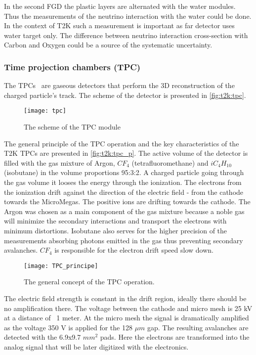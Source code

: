 \documentclass[../main.tex]{subfiles}
\begin{document}
In the second FGD the plastic layers are alternated with the water modules. Thus the measurements of the neutrino interaction with the water could be done. In the context of T2K such a measurement is important as far detector uses water target only. The difference between neutrino interaction cross-section with Carbon and Oxygen could be a source of the systematic uncertainty.

\subsubsection{Time projection chambers (TPC)}
The TPCs~\cite{Abgrall2011} are gaseous detectors that perform the 3D reconstruction of the charged particle's track. The scheme of the detector is presented in \autoref{fig:t2k:tpc}.

\begin{figure}[!ht]
  \centering
  \texttt{[image: tpc]}
  \caption{The scheme of the TPC module}
  \label{fig:t2k:tpc}
\end{figure}

The general principle of the TPC operation and the key characteristics of the T2K TPCs are presented in \autoref{fig:t2k:tpc_p}. The active volume of the detector is filled with the gas mixture of Argon, $CF_4$ (tetrafluoromethane) and $iC_4H_{10}$ (isobutane) in the volume proportions 95:3:2. A charged particle going through the gas volume it looses the energy through the ionization. The electrons from the ionization drift against the direction of the electric field - from the cathode towards the MicroMegas. The positive ions are drifting towards the cathode. The Argon was chosen as a main component of the gas mixture because a noble gas will minimize the secondary interactions and transport the electrons with minimum distortions. Isobutane also serves for the higher precision of the measurements absorbing photons emitted in the gas thus preventing secondary avalanches. $CF_4$ is responsible for the electron drift speed slow down.

\begin{figure}[!ht]
  \centering
  \texttt{[image: TPC\_principe]}
  \caption{The general concept of the TPC operation.}
  \label{fig:t2k:tpc_p}
\end{figure}

The electric field strength is constant in the drift region, ideally there should be no amplification there. The voltage between the cathode and micro mesh is 25 kV at a distance of ~1 meter. At the micro mesh the signal is dramatically amplified as the voltage 350 V is applied for the 128 $\mu m$ gap. The resulting avalanches are detected with the 6.9x9.7 $mm^2$ pads. Here the electrons are transformed into the analog signal that will be later digitized with the electronics.
\end{document}
